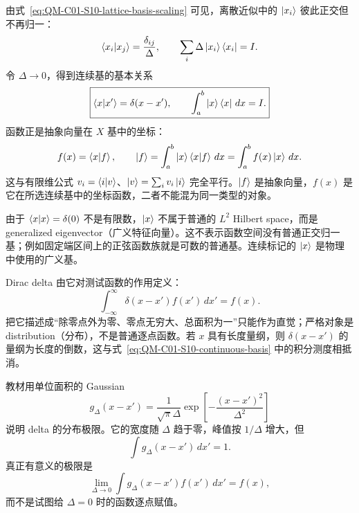 由式~\eqref{eq:QM-C01-S10-lattice-basis-scaling} 可见，离散近似中的 $\left|x_i\right\rangle$ 彼此正交但不再归一：
\begin{equation}
  \left\langle x_i \middle| x_j \right\rangle=\frac{\delta_{ij}}{\Delta},
  \qquad
  \sum_i\Delta\left|x_i\right\rangle\left\langle x_i\right|=I.
  \label{eq:QM-C01-S10-lattice-completeness}
\end{equation}
令 $\Delta\to0$，得到连续基的基本关系
\begin{equation}
  \boxed{
  \left\langle x \middle| x' \right\rangle=\delta(x-x'),
  \qquad
  \int_a^b\left|x\right\rangle\left\langle x\right|\,dx=I.}
  \label{eq:QM-C01-S10-continuous-basis}
\end{equation}
函数正是抽象向量在 $X$ 基中的坐标：
\begin{equation}
  f(x)=\left\langle x \middle| f \right\rangle,
  \qquad
  \left|f\right\rangle=\int_a^b\left|x\right\rangle\left\langle x \middle| f \right\rangle\,dx
  =\int_a^b f(x)\left|x\right\rangle\,dx.
  \label{eq:QM-C01-S10-function-as-components}
\end{equation}
这与有限维公式 $v_i=\left\langle i \middle| v \right\rangle$、$\left|v\right\rangle=\sum_i v_i\left|i\right\rangle$ 完全平行。$\left|f\right\rangle$ 是抽象向量，$f(x)$ 是它在所选连续基中的坐标函数，二者不能混为同一类型的对象。

由于 $\left\langle x \middle| x \right\rangle=\delta(0)$ 不是有限数，$\left|x\right\rangle$ 不属于普通的 $L^2$ Hilbert space，而是 generalized eigenvector（广义特征向量）。这不表示函数空间没有普通正交归一基；例如固定端区间上的正弦函数族就是可数的普通基。连续标记的 $\left|x\right\rangle$ 是物理中使用的广义基。


Dirac delta 由它对测试函数的作用定义：
\begin{equation}
  \boxed{
  \int_{-\infty}^{\infty}
  \delta(x-x')f(x')\,dx'=f(x).}
  \label{eq:QM-C01-S10-delta-sampling}
\end{equation}
把它描述成“除零点外为零、零点无穷大、总面积为一”只能作为直觉；严格对象是 distribution（分布），不是普通逐点函数。若 $x$ 具有长度量纲，则 $\delta(x-x')$ 的量纲为长度的倒数，这与式~\eqref{eq:QM-C01-S10-continuous-basis} 中的积分测度相抵消。

教材用单位面积的 Gaussian
\begin{equation}
  g_\Delta(x-x')
  =\frac{1}{\sqrt{\pi}\Delta}
  \exp\left[-\frac{(x-x')^2}{\Delta^2}\right]
  \label{eq:QM-C01-S10-gaussian-delta}
\end{equation}
说明 delta 的分布极限。它的宽度随 $\Delta$ 趋于零，峰值按 $1/\Delta$ 增大，但
\[
  \int g_\Delta(x-x')\,dx'=1.
\]
真正有意义的极限是
\begin{equation}
  \lim_{\Delta\to0}
  \int g_\Delta(x-x')f(x')\,dx'=f(x),
  \label{eq:QM-C01-S10-gaussian-distribution-limit}
\end{equation}
而不是试图给 $\Delta=0$ 时的函数逐点赋值。

